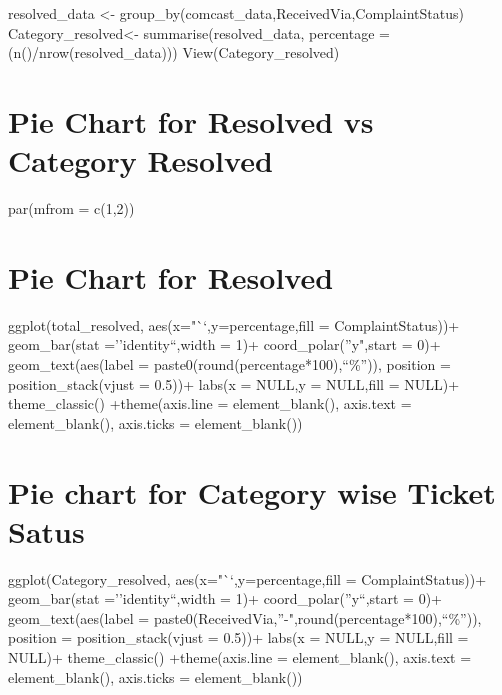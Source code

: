 \documentclass[
]{article}
\begin{document}
resolved\_data \textless-
group\_by(comcast\_data,ReceivedVia,ComplaintStatus)
Category\_resolved\textless- summarise(resolved\_data, percentage
=(n()/nrow(resolved\_data))) View(Category\_resolved)

\hypertarget{pie-chart-for-resolved-vs-category-resolved}{%
\section{Pie Chart for Resolved vs Category
Resolved}\label{pie-chart-for-resolved-vs-category-resolved}}

par(mfrom = c(1,2))

\hypertarget{pie-chart-for-resolved}{%
\section{Pie Chart for Resolved}\label{pie-chart-for-resolved}}

ggplot(total\_resolved, aes(x="``,y=percentage,fill = ComplaintStatus))+
geom\_bar(stat =''identity``,width = 1)+ coord\_polar(''y",start = 0)+
geom\_text(aes(label = paste0(round(percentage*100),``\%'')), position =
position\_stack(vjust = 0.5))+ labs(x = NULL,y = NULL,fill = NULL)+
theme\_classic() +theme(axis.line = element\_blank(), axis.text =
element\_blank(), axis.ticks = element\_blank())

\hypertarget{pie-chart-for-category-wise-ticket-satus}{%
\section{Pie chart for Category wise Ticket
Satus}\label{pie-chart-for-category-wise-ticket-satus}}

ggplot(Category\_resolved, aes(x="``,y=percentage,fill =
ComplaintStatus))+ geom\_bar(stat =''identity``,width = 1)+
coord\_polar(''y``,start = 0)+ geom\_text(aes(label =
paste0(ReceivedVia,''-",round(percentage*100),``\%'')), position =
position\_stack(vjust = 0.5))+ labs(x = NULL,y = NULL,fill = NULL)+
theme\_classic() +theme(axis.line = element\_blank(), axis.text =
element\_blank(), axis.ticks = element\_blank())
\end{document}
